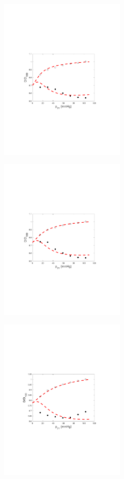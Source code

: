 \documentclass[../main.tex]{article}
\begin{document}
\begin{figure}[t!]
\begin{center}
\begin{subfigure}{0.45\textwidth}
		\end{subfigure}
		\begin{subfigure}{0.45\textwidth}
			\centering
			\includegraphics[width=2.5in,trim={3.25cm 8cm 4cm 8cm},clip]{LA_subepi.pdf}
		\end{subfigure}
		\begin{subfigure}{0.45\textwidth}
			\centering
			\includegraphics[width=2.5in,trim={3.25cm 8cm 4cm 8cm},clip]{IA_subepi.pdf}
		\end{subfigure}
		\begin{subfigure}{0.45\textwidth}
			\centering
			\includegraphics[width=2.5in,trim={3.25cm 8cm 4cm 8cm},clip]{SA_subepi.pdf}

\end{subfigure}
\end{center}
\end{figure}
\end{document}
